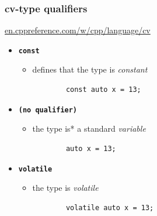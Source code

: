 \documentclass[aspectratio=169]{beamer}
\newcommand{\cpp}[1]{\texttt{\textbf{\textcolor{clCodeBlue}{#1}}}}
\begin{document}
\begin{frame}[fragile]
\frametitle{cv-type qualifiers}
\href{https://en.cppreference.com/w/cpp/language/cv}{en.cppreference.com/w/cpp/language/cv}
\vspace{6pt}
  \begin{itemize}
    \item<2->{\cpp{const}}
    \begin{itemize}
      \item{defines that the type is \textit{constant} \hspace{2em} }
      \begin{lstlisting}
        const auto x = 13;
      \end{lstlisting}
    \end{itemize}

    \vspace{3pt}
    \item<3->{\cpp{(no qualifier)}}
    \begin{itemize}
      \item{the type is* a standard \textit{variable} \hspace{2.4em} }
      \begin{lstlisting}
        auto x = 13;
      \end{lstlisting}
    \end{itemize}

    \vspace{3pt}
    \item<4->{\cpp{volatile}}
    \begin{itemize}
      \item{the type is \textit{volatile} \hspace{7.8em} }
      \begin{lstlisting}
        volatile auto x = 13;
      \end{lstlisting}
    \end{itemize}
  \end{itemize}
\end{frame}
\end{document}
